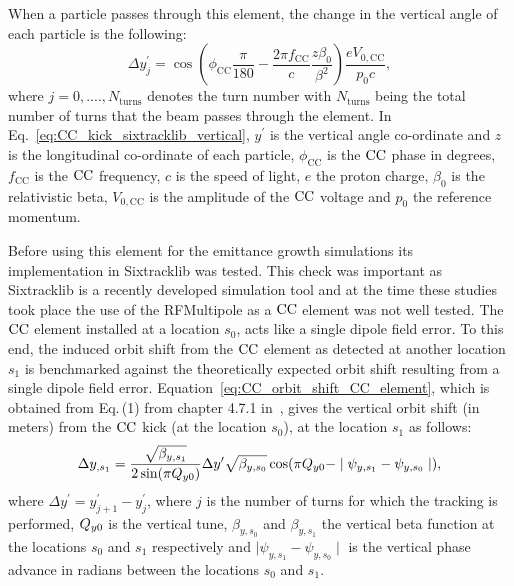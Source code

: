 When a particle passes through this element, the change in the vertical angle of each particle is the following:
\begin{equation}\label{eq:CC_kick_sixtracklib_vertical}
    \Delta y^\prime_{j} = \cos{\left ( \phi_\mathrm{CC} \frac{\pi}{180} - \frac{2\pi f_\mathrm{CC}}{c} \frac{z \beta_0}{\beta^2} \right )} \frac{e V_\mathrm{0,CC}}{p_0 c},
\end{equation}
where $j={0, ...., N_\mathrm{turns}}$ denotes the turn number with $N_\mathrm{turns}$ being the total number of turns that the beam passes through the element. In Eq.~\eqref{eq:CC_kick_sixtracklib_vertical}, $y^\prime$ is the vertical angle co-ordinate and $z$ is the longitudinal co-ordinate of each particle, $\phi_\mathrm{CC}$ is the ${\mathrm{CC}}$ phase in degrees, $f_\mathrm{CC}$ is the ${\mathrm{CC}}$ frequency, $c$ is the speed of light, $e$ the proton charge, $\beta_0$ is the relativistic beta, $V_\mathrm{0,CC}$ is the amplitude of the ${\mathrm{CC}}$ voltage and $p_0$ the reference momentum.

Before using this element for the emittance growth simulations its implementation in Sixtracklib was tested. This check was important as Sixtracklib is a recently developed simulation tool and at the time these studies took place the use of the RFMultipole as a ${\mathrm{CC}}$ element was not well tested. The ${\mathrm{CC}}$ element installed at a location $s_0$, acts like a single dipole field error. To this end, the induced orbit shift from the ${\mathrm{CC}}$ element as detected at another location $s_1$ is benchmarked against the theoretically expected orbit shift resulting from a single dipole field error. %
Equation~\eqref{eq:CC_orbit_shift_CC_element}, which is obtained from Eq.\,(1) from chapter 4.7.1 in~\cite{Chao:1490001}, gives the vertical orbit shift (in meters) from the ${\mathrm{CC}}$ kick (at the location $s_0$), at the location $s_1$ as follows:
\begin{equation}\label{eq:CC_orbit_shift_CC_element}
    \Delta y_{,s_1} = \frac{\sqrt{\beta_{y, s_1}}}{2 \sin(\pi {Q_{y0}})} \Delta y^\prime \sqrt{\beta_{y, s_0}} \cos(\pi {Q_{y0}} - \mid \psi_{y, s_1} - \psi_{y, s_0} \mid),
 \end{equation}
where $\Delta y^\prime=y^\prime_{j+1}-y^\prime_{j}$, where $j$ is the number of turns for which the tracking is performed, ${Q_{y0}}$ is the vertical tune, $\beta_{y, s_0}$ and $\beta_{y, s_1}$ the vertical beta function at the locations $s_0$ and $s_1$ respectively and $\mid \psi_{y, s_1} - \psi_{y, s_0} \mid$ is the vertical phase advance in radians between the locations $s_0$ and $s_1$.

